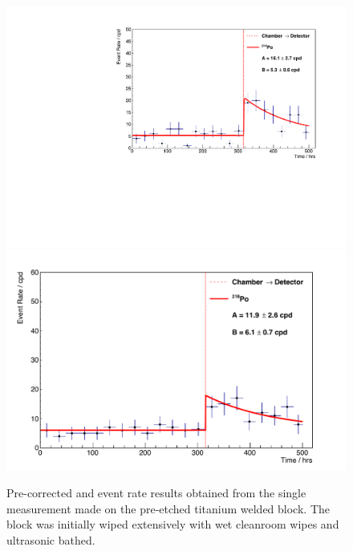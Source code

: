 \begin{figure}[h!]
    \centering
    \includegraphics[scale=0.42]{Chapter_4/Figures/ucl_measurements/titanium_welding_block_pre_etching_1_Po214.pdf}
    \includegraphics[scale=0.42]{Chapter_4/Figures/ucl_measurements/titanium_welding_block_pre_etching_1_Po218.pdf}
    \caption[Pre-corrected \PoTOF{} and \PoTOE{} event rate results obtained from the single measurement made on the pre-etched titanium welded block. The block was initially wiped extensively with wet cleanroom wipes and ultrasonic bathed.]
    {Pre-corrected \PoTOF{} and \PoTOE{} event rate results obtained from the single measurement made on the pre-etched titanium welded block. The block was initially wiped extensively with wet cleanroom wipes and ultrasonic bathed.}
    \label{fig:ti_pre_etched_welded_block_results}
\end{figure}
%
%
